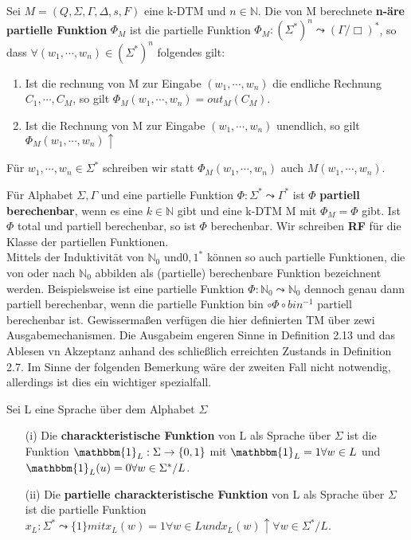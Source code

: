   Sei \(M = (Q, \Sigma, \Gamma, \Delta, s, F)\) eine k-DTM und \(n \in \mathbb{N}\). Die von M berechnete \textbf{n-äre partielle Funktion} \(\Phi_M\) ist die partielle Funktion \(\Phi_M : (\Sigma^*)^n \leadsto (\Gamma / {\Box})^*\), so dass \(\forall (w_1, \cdots, w_n) \in (\Sigma^*)^n\) folgendes gilt:
  \begin{enumerate}
    \item Ist die rechnung von M zur Eingabe \((w_1, \cdots, w_n)\) die endliche Rechnung \(C_1, \cdots, C_M\), so gilt \(\Phi_M(w_1, \cdots, w_n) = out_M(C_M)\).
    \item Ist die Rechnung von M zur Eingabe \((w_1, \cdots, w_n)\) unendlich, so gilt \(\Phi_M(w_1, \cdots, w_n)\uparrow\) 
  \end{enumerate}
  Für \(w_1, \cdots, w_n \in \Sigma^*\) schreiben wir statt \(\Phi_M(w_1, \cdots, w_n)\) auch \(M(w_1, \cdots, w_n)\).

  Für Alphabet \(\Sigma, \Gamma\) und eine partielle Funktion \(\Phi : \Sigma^* \leadsto \Gamma^*\) ist \(\Phi\) \textbf{partiell berechenbar}, wenn es eine \(k \in \mathbb{N}\) gibt und eine k-DTM M mit \(\Phi_M = \Phi\) gibt. Ist \(\Phi\) total und partiell berechenbar, so ist \(\Phi\) berechenbar. Wir schreiben \textbf{RF} für die Klasse der partiellen Funktionen.\\Mittels der Induktivität von \(\mathbb{N}_0\) und\( {0, 1}^*\) können so auch partielle Funktionen, die von oder nach \(\mathbb{N}_0\) abbilden als (partielle) berechenbare Funktion bezeichnent werden. Beispielsweise ist eine partielle Funktion \(\Phi : \mathbb{N}_0 \leadsto \mathbb{N}_0\) dennoch genau dann partiell berechenbar, wenn die partielle Funktion bin \(\circ \Phi \circ bin^{-1}\) partiell berechenbar ist. Gewissermaßen verfügen die hier definierten TM über zewi Ausgabemechanismen. Die Ausgabeim engeren Sinne in Definition 2.13 und das Ablesen vn Akzeptanz anhand des schließlich erreichten Zustands in Definition 2.7. Im Sinne der folgenden Bemerkung wäre der zweiten Fall nicht notwendig, allerdings ist dies ein wichtiger spezialfall.

  Sei L eine Sprache über dem Alphabet \(\Sigma\)
  \begin{itemize}
    \item [(i)] Die \textbf{charackteristische Funktion} von L als Sprache über \(\Sigma\) ist die Funktion \(\mathbbm{1}_L : \Sigma \rightarrow \{0, 1\}\) mit \(\mathbbm{1}_L = 1 \forall w \in L\) und \(\mathbbm{1}_L (u) = 0 \forall w \in \Sigma^* / L\).
    \item [(ii)] Die \textbf{ partielle charackteristische Funktion} von L als Sprache über \(\Sigma\) ist die partielle Funktion \(x_L : \Sigma^* \leadsto \{1\} mit x_L(w) = 1 \forall w \in L und x_L(w) \uparrow  \forall w \in \Sigma^* / L\). 
  \end{itemize}

